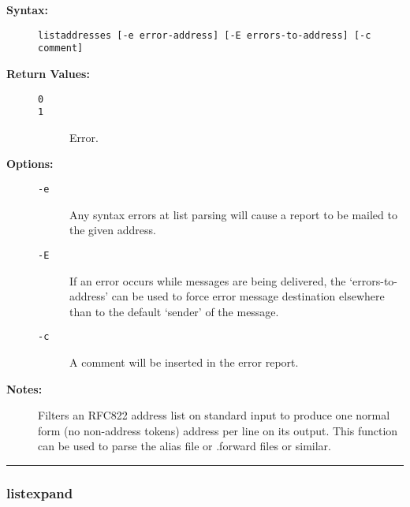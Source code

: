\begin{description}
\item[{\bf Syntax:}] \mbox{}

{\tt listaddresses [-e error-address] [-E errors-to-address] [-c comment]}

\item[{\bf Return Values:}] \mbox{}

\begin{description}
\item[{\tt 0}] \mbox{}



\item[{\tt 1}] \mbox{}

Error.

\end{description}


\item[{\bf Options:}] \mbox{}

\begin{description}
\item[{\tt -e}] \mbox{}

Any syntax errors at list parsing will cause a 
report to be mailed to the given address.

\item[{\tt -E}] \mbox{}

If an error occurs while messages are being delivered, 
the `errors-to-address' can be used to force error message destination 
elsewhere than to the default `sender' of the message.

\item[{\tt -c}] \mbox{}

A comment will be inserted in the error report.

\end{description}


\item[{\bf Notes:}] \mbox{}

Filters an RFC822 address list on standard input 
to produce one normal form (no non-address tokens) address per line on 
its output. This function can be used to parse the alias file or .forward 
files or similar.

\end{description}


\hrule
\subsubsection{listexpand}

